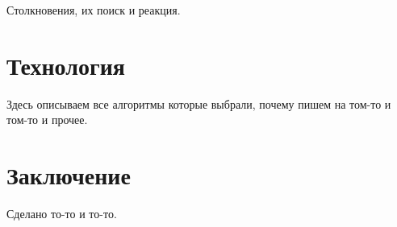 \documentclass[a4paper,12pt]{article}
\begin{document}
Столкновения, их поиск и реакция.

\section{Технология}

Здесь описываем все алгоритмы которые выбрали, почему пишем на том-то и том-то и прочее.


\section{Заключение}

Сделано то-то и то-то.
\end{document}
